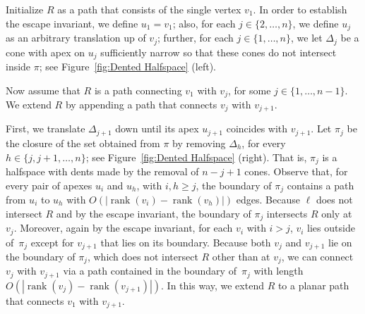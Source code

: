 \documentclass{patmorin}
\DeclareMathOperator{\rank}{rank}
\begin{document}

Initialize $R$ as a path that consists of the single vertex $v_1$. In order to establish the escape invariant, we define $u_1=v_1$; also, for each $j\in \{2,\dots,n\}$, we define $u_j$ as an arbitrary translation up of $v_j$; further, for each $j\in \{1,\dots,n\}$, we let $\Delta_j$ be a cone with apex on $u_j$ sufficiently narrow so that these cones do not intersect inside $\pi$; see Figure~\ref{fig:Dented Halfspace} (left).

Now assume that $R$ is a path connecting $v_1$ with $v_j$, for some $j\in \{1,\dots,n-1\}$. We extend $R$ by appending a
path that connects $v_j$ with $v_{j+1}$.

First, we translate $\Delta_{j+1}$ down until its apex $u_{j+1}$ coincides with $v_{j+1}$. Let $\pi_j$ be the closure of the set obtained from $\pi$ by removing $\Delta_h$, for every $h\in\{j,j+1,\ldots,n\}$; see Figure~\ref{fig:Dented Halfspace} (right). That is, $\pi_j$ is a halfspace with dents made by the removal of $n-j+1$ cones.
Observe that, for every pair of apexes $u_i$ and $u_h$, with $i,h\geq j$, the boundary of $\pi_j$
contains a path from $u_i$ to $u_h$ with $O(|\rank(v_i)-\rank(v_h)|)$ edges.
Because $\ell$ does not intersect $R$ and by the escape invariant, the boundary of $\pi_j$ intersects $R$ only at $v_j$. Moreover, again by the escape invariant, for each $v_i$ with $i > j$, $v_i$ lies outside of~$\pi_j$ except for $v_{j+1}$ that lies on its boundary. Because both $v_j$ and $v_{j+1}$ lie on the boundary of $\pi_j$, which does not intersect $R$ other than at $v_j$, we can connect $v_j$ with $v_{j+1}$ via a path contained in the boundary of~$\pi_j$ with length $O(|\rank(v_j) - \rank(v_{j+1})|)$. In this way, we extend $R$ to a planar path that connects $v_1$ with $v_{j+1}$.
\end{document}
